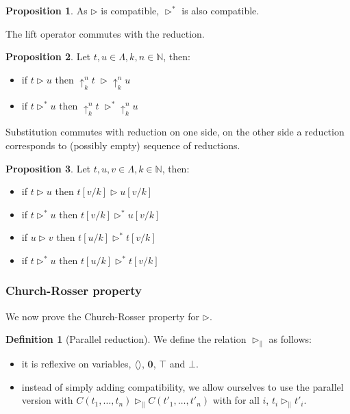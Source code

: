 \documentclass{article}
\newcommand{\bO}[0]{\boldsymbol{0}}
\newcommand{\Tt}[0]{\top}
\newcommand{\Ff}[0]{\bot}
\newcommand{\bN}[0]{\mathbb N}
\newcommand{\lift}[2]{\uparrow_{#1}^{#2}}
\theoremstyle{definition}
\newtheorem{defi}{Definition}
\newtheorem{prop}{Proposition}[subsection]
\begin{document}
\begin{prop}
    As $\rhd$ is compatible, $\rhd^*$ is also compatible.
\end{prop}

The lift operator commutes with the reduction.

\begin{prop}
    Let $t,u\in\Lambda,k,n\in\bN$, then:
    \begin{itemize}
        \item if $t\rhd u$ then $\lift k n t\;\rhd \lift k n u$
        \item if $t\rhd^* u$ then $\lift k n t\; \rhd^* \lift k n u$
    \end{itemize}
\end{prop}

Substitution commutes with reduction on one side, on the other side a reduction corresponds to (possibly
empty) sequence of reductions.

\begin{prop}
    Let $t,u,v\in\Lambda,k\in\bN$, then:
    \begin{itemize}
        \item if $t\rhd u$ then $t[v/k]\rhd u[v/k]$
        \item if $t\rhd^* u$ then $t[v/k] \rhd^* u[v/k]$
        \item if $u\rhd v$ then $t[u/k]\rhd^* t[v/k]$
        \item if $t\rhd^* u$ then $t[u/k] \rhd^* t[v/k]$
    \end{itemize}
\end{prop}

\subsubsection{Church-Rosser property}

We now prove the Church-Rosser property for $\rhd$.

\begin{defi}[Parallel reduction]
    We define the relation $\rhd_\|$ as follows:
    \begin{itemize}
        \item it is reflexive on variables, $\langle\rangle$, $\bO$, $\Tt$ and $\Ff$.
        \item instead of simply adding compatibility, we allow ourselves to use the parallel version with
        $C(t_1,\ldots,t_n)\rhd_\| C(t'_1,\ldots,t'_n)$ with for all $i$, $t_i\rhd_\| t'_i$.
    \end{itemize}
\end{defi}
\end{document}
